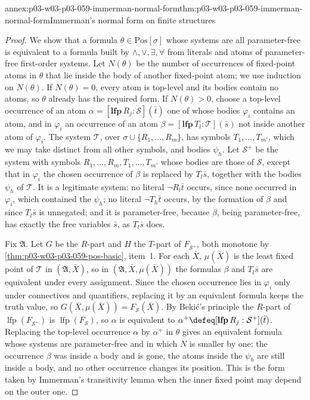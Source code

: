 \begin{annexitem}{annex:p03-w03-p03-059-immerman-normal-form}{thm:p03-w03-p03-059-immerman-normal-form}{Immerman's normal form on finite structures}
\begin{proof}
We show that a formula \(\theta\in\mathrm{Pos}[\sigma]\) whose systems are
all parameter-free is equivalent to a formula built by \(\land,\lor,
\exists,\forall\) from literals and atoms of parameter-free first-order
systems. Let \(N(\theta)\) be the number of occurrences of fixed-point atoms
in \(\theta\) that lie inside the body of another fixed-point atom; we use
induction on \(N(\theta)\). If \(N(\theta)=0\), every atom is top-level and
its bodies contain no atoms, so \(\theta\) already has the required form.
If \(N(\theta)>0\), choose a top-level occurrence of an atom
\(\alpha=[\mathbf{lfp}\,R_j:\mathcal S](\bar t)\) one of whose bodies
\(\varphi_i\) contains an atom, and in \(\varphi_i\) an occurrence of an atom
\(\beta=[\mathbf{lfp}\,T_l:\mathcal T](\bar s)\) not inside another atom
of \(\varphi_i\). The system \(\mathcal T\), over
\(\sigma\cup\{R_1,\ldots,R_m\}\), has symbols \(T_1,\ldots,T_{m'}\), which
we may take distinct from all other symbols, and bodies \(\psi_h\). Let
\(\mathcal S^+\) be the system with symbols \(R_1,\ldots,R_m,
T_1,\ldots,T_{m'}\) whose bodies are those of \(\mathcal S\), except that in
\(\varphi_i\) the chosen occurrence of \(\beta\) is replaced by
\(T_l\bar s\), together with the bodies \(\psi_h\) of \(\mathcal T\). It is
a legitimate system: no literal \(\neg R_l\bar t\) occurs, since none
occurred in \(\varphi_i\), which contained the \(\psi_h\); no literal
\(\neg T_h\bar t\) occurs, by the formation of \(\beta\) and since \(T_l\bar
s\) is unnegated; and it is parameter-free, because \(\beta\), being
parameter-free, has exactly the free variables \(\bar s\), as \(T_l\bar s\)
does.

Fix \(\mathfrak A\). Let \(G\) be the \(R\)-part and \(H\) the \(T\)-part of
\(F_{\mathcal S^+}\), both monotone by
\cref{thm:p03-w03-p03-059-pos-basic}, item~1. For each \(\bar X\),
\(\mu(\bar X)\) is the least fixed point of \(\mathcal T\) in
\((\mathfrak A,\bar X)\), so in \((\mathfrak A,\bar X,\mu(\bar X))\) the
formulas \(\beta\) and \(T_l\bar s\) are equivalent under every assignment.
Since the chosen occurrence lies in \(\varphi_i\) only under connectives and
quantifiers, replacing it by an equivalent formula keeps the truth value,
so \(G(\bar X,\mu(\bar X))=F_{\mathcal S}(\bar X)\). By Beki\'c's principle
the \(R\)-part of \(\operatorname{lfp}(F_{\mathcal S^+})\) is
\(\operatorname{lfp}(F_{\mathcal S})\), so \(\alpha\) is equivalent to
\(\alpha^+\defeq[\mathbf{lfp}\,R_j:\mathcal S^+](\bar t)\). Replacing the
top-level occurrence \(\alpha\) by \(\alpha^+\) in \(\theta\) gives an
equivalent formula whose systems are parameter-free and in which \(N\) is
smaller by one: the occurrence \(\beta\) was inside a body and is gone,
the atoms inside the \(\psi_h\) are still inside a body, and no other
occurrence changes its position. This is the form taken by Immerman's
transitivity lemma \cite[Lemma~4.2, p.~96]{Immerman1986} when the inner
fixed point may depend on the outer one.


\end{proof}
\end{annexitem}
